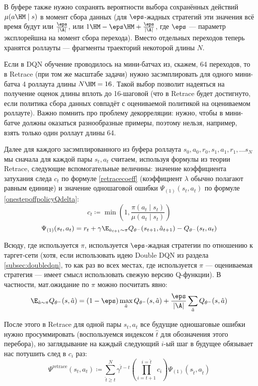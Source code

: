 В буфере также нужно сохранять вероятности выбора сохранённых действий $\mu(a \HM\mid s)$ в момент сбора данных (для $\eps$-жадных стратегий эти значения всё время будут или $\frac{\eps}{|\A|}$, или $1 \HM- \eps \HM+ \frac{\eps}{|\A|}$, где $\eps$ --- параметр эксплорейшна на момент сбора перехода). Вместо отдельных переходов теперь хранятся роллауты --- фрагменты траекторий некоторой длины $N$.

\begin{remark}
Если в DQN обучение проводилось на мини-батчах из, скажем, 64 переходов, то в Retrace (при том же масштабе задачи) нужно засэмплировать для одного мини-батча 4 роллаута длины $N\HM=16$. Такой выбор позволит надеяться на получение оценок длины вплоть до 16-шаговой (что в Retrace будет достигнуто, если политика сбора данных совпадёт с оцениваемой политикой на оцениваемом роллауте). Важно помнить про проблему декорреляции: нужно, чтобы в мини-батче должны оказаться разнообразные примеры, поэтому нельзя, например, взять только один роллаут длины 64.  
\end{remark}

Далее для каждого засэмплированного из буфера роллаута $s_0, a_0, r_0, s_1, a_1, r_1, \dots s_N$ мы сначала для каждой пары $s_t, a_t$ считаем, используя формулы из теории Retrace, следующие вспомогательные величины: значение коэффициента затухания следа $c_t$ по формуле \eqref{retracecoeff} (коэффициент $\lambda$ обычно полагают равным единице) и значение одношаговой ошибки $\Psi_{(1)}(s_t, a_t)$ по формуле \eqref{onestepoffpolicyQdelta}:
$$c_t \coloneqq \min \left( 1, \frac{\pi(a_t \mid s_t) }{\mu(a_t \mid s_t)} \right) $$
$$\Psi_{(1)}(s_t, a_t) = r_t + \gamma \E_{\hat{a}_{t+1} \sim \pi} Q_{\theta^{-}}(s_{t+1}, \hat{a}_{t+1}) - Q_{\theta^{-}}(s_t, a_t)$$

Всюду, где используется $\pi$, используется $\eps$-жадная стратегии по отношению к таргет-сети (хотя, если использовать идею Double DQN из раздела \ref{subsec:doubledqn}, то как раз во всех местах, где используется $\pi$ --- оцениваемая стратегия --- имеет смысл использовать свежую версию Q-функции). В частности, мат.ожидание по $\pi$ можно посчитать явно:
$$\E_{\hat{a} \sim \pi} Q_{\theta^{-}}(s, \hat{a}) = (1 - \eps) \max_{\hat{a}} Q_{\theta^{-}}(s, \hat{a}) + \frac{\eps}{|\A|} \sum_{\hat{a}} Q_{\theta^{-}}(s, \hat{a}) $$

После этого в Retrace для одной пары $s_t, a_t$ все будущие одношаговые ошибки нужно просуммировать (воспользуемся индексом $\hat{t}$ для обозначения этого перебора), но заглядывание на каждый следующий $i$-ый шаг в будущее обязывает нас потушить след в $c_i$ раз: 
$$\Psi^{\mathrm{retrace}}(s_t, a_t) \coloneqq \sum_{\hat{t} \ge t}^N \gamma^{\hat{t} - t}  \left( \prod_{i = t+1}^{i = \hat{t}} c_{i} \right) \Psi_{(1)}(s_{\hat{t}}, a_{\hat{t}})$$

